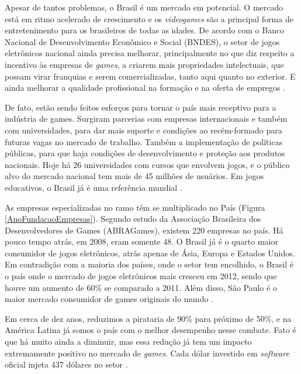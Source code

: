 %
%
Apesar de tantos problemas, o Brasil é um mercado em potencial. O mercado está em ritmo acelerado de crescimento e os \textit{videogames} são a principal forma de entretenimento para os brasileiros de todas as idades. De acordo com o Banco Nacional de Desenvolvimento Econômico e Social (BNDES), o setor de jogos eletrônicos nacional ainda precisa melhorar, principalmente no que diz respeito a incentivo às empresas de \textit{games}, a criarem mais propriedades intelectuais, que possam virar franquias e serem comercializadas, tanto aqui quanto no exterior. E ainda melhorar a qualidade profissional na formação e na oferta de empregos \cite{GEDIGames}.
\par
De fato, estão sendo feitos esforços para tornar o país mais receptivo para a indústria de games. Surgiram parcerias com empresas internacionais e também com universidades, para dar mais suporte e condições ao recém-formado para futuras vagas no mercado de trabalho. Também a implementação de políticas públicas, para que haja condições de desenvolvimento e proteção aos produtos nacionais. Hoje há 26 universidades com cursos que envolvem jogos, e o público alvo do mercado nacional tem mais de 45 milhões de usuários. Em jogos educativos, o Brasil já é uma referência mundial \cite{GEDIGames}.

As empresas especializadas no ramo têm se multiplicado no País (Figura \ref{AnoFundacaoEmpresas}). Segundo estudo da Associação Brasileira dos Desenvolvedores de Games (ABRAGames), existem 220 empresas no país. Há pouco tempo atrás, em 2008, eram somente 48. O Brasil já é o quarto maior consumidor de jogos eletrônicos, atrás apenas de Ásia, Europa e Estados Unidos. Em contradição com a maioria dos países, onde o setor tem encolhido, o Brasil é o país onde o mercado de jogos eletrônicos mais cresceu em 2012, sendo que houve um aumento de 60\% se comparado a 2011. Além disso, São Paulo é o maior mercado consumidor de games originais do mundo \cite{GEDIGames}.

Em cerca de dez anos, reduzimos a pirataria de 90\% para próximo de 50\%, e na América Latina já somos o país com o melhor desempenho nesse combate. Fato é que há muito ainda a diminuir, mas essa redução já tem um impacto extremamente positivo no mercado de \textit{games}. Cada dólar investido em \textit{software} oficial injeta 437 dólares no setor \cite{GEDIGames}.

